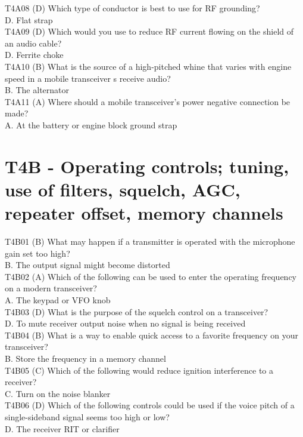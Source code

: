 \documentclass[12pt,letterpaper]{report}
\begin{document}
T4A08 (D) Which type of conductor is best to use for RF grounding?\\
D. Flat strap\\

T4A09 (D) Which would you use to reduce RF current flowing on the shield of an audio cable?\\
D. Ferrite choke\\

T4A10 (B) What is the source of a high-pitched whine that varies with engine speed in a mobile transceiver s receive audio?\\
B. The alternator\\

T4A11 (A) Where should a mobile transceiver's power negative connection be made?\\
A. At the battery or engine block ground strap\\

\section{T4B - Operating controls; tuning, use of filters, squelch, AGC, repeater offset, memory channels}

T4B01 (B) What may happen if a transmitter is operated with the microphone gain set too high?\\
B. The output signal might become distorted\\

T4B02 (A) Which of the following can be used to enter the operating frequency on a modern transceiver?\\
A. The keypad or VFO knob\\

T4B03 (D) What is the purpose of the squelch control on a transceiver?\\
D. To mute receiver output noise when no signal is being received\\

T4B04 (B) What is a way to enable quick access to a favorite frequency on your transceiver?\\
B. Store the frequency in a memory channel\\

T4B05 (C) Which of the following would reduce ignition interference to a receiver?\\
C. Turn on the noise blanker\\

T4B06 (D) Which of the following controls could be used if the voice pitch of a single-sideband signal seems too high or low?\\
D. The receiver RIT or clarifier\\
\end{document}
